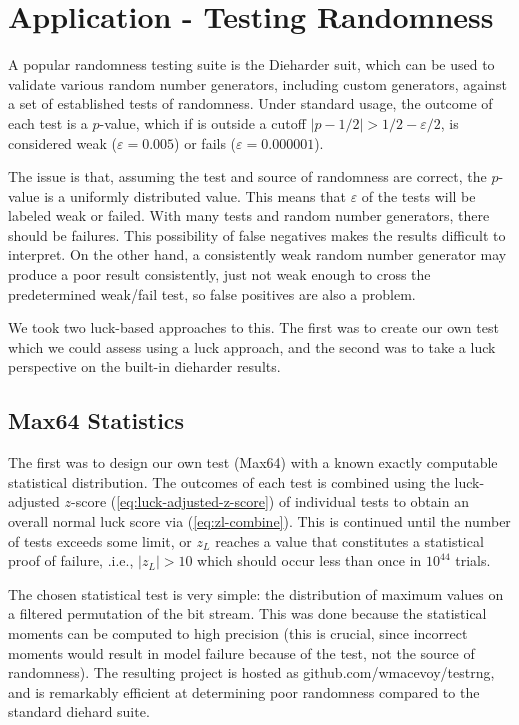 \chapter{Application - Testing Randomness}
A popular randomness testing suite is the Dieharder suit, which can be used to validate various random number generators, including custom generators, against a set of established tests of randomness.  Under standard usage, the outcome of each test is a $p$-value, which if is outside a cutoff $|p-1/2|>1/2-\varepsilon/2$, is considered weak ($\varepsilon=0.005$) or fails ($\varepsilon=0.000001$).

The issue is that, assuming the test and source of randomness are correct, the $p$-value is a uniformly distributed value.  This means that $\varepsilon$ of the tests will be labeled weak or failed.  With many tests and random number generators, there should be failures.  This possibility of false negatives makes the results difficult to interpret.  On the other hand, a consistently weak random number generator may produce a poor result consistently, just not weak enough to cross the predetermined weak/fail test, so false positives are also a problem.

We took two luck-based approaches to this.  The first was to create our own test which we could assess using a luck approach, and the second was to take a luck perspective on the built-in dieharder results.

\section{Max64 Statistics}

The first was to design our own test (Max64) with a known exactly computable statistical distribution.  The outcomes of each test is combined using the luck-adjusted $z$-score (\ref{eq:luck-adjusted-z-score}) of individual tests to obtain an overall normal luck score via (\ref{eq:zl-combine}).  This is continued until the number of tests exceeds some limit, or $z_L$ reaches a value that constitutes a statistical proof of failure, .i.e., $|z_L|>10$ which should occur less than once in $10^{44}$ trials.

The chosen statistical test is very simple: the distribution of maximum values on a filtered permutation of the bit stream.  This was done because the statistical moments can be computed to high precision (this is crucial, since incorrect moments would result in model failure because of the test, not the source of randomness).  The resulting project is hosted as github.com/wmacevoy/testrng, and is remarkably efficient at determining poor randomness compared to the standard diehard suite.

